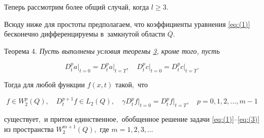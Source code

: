 \smallskip




Теперь рассмотрим более общий случай, когда $l\ge 3$. 

Всюду ниже для простоты предполагаем, что коэффициенты уравнения \eqref{eq:(1)} бесконечно дифференцируемы в~замкнутой области $\overline{Q}$.



\smallskip



\hypertarget{dzh:th4}{}



{\small\sc Теорема 4.} \it Пусть выполнены условия теоремы \rm \hyperlink{dzh:th3}{3}, \it кроме того\rm,  \it пусть 

$$

D_{t}^{p} a \bigr|_{t=0}=D_{t}^{p}  a \bigr| _{t=T}, \quad 

D_{t}^{p} c \bigr|_{t=0}=D_{t}^{p}  c \bigr|_{t=T}.

$$ 

Тогда для любой функции $f(x,t)$ такой$,$ что 

$$

f\in W_{2}^{p}(Q),\quad  

D_{t}^{p+1}f\in {{L}_{2}}(Q),\quad  

\gamma D_{t}^{p} f \bigr|_{t=0}=

D_{t}^{p} f \bigr|_{t=T},\quad p=0, 1, 2,\dots,m-1$$ 

существует$,$ и притом единственное$,$  обобщенное решение задачи \eqref{eq:(1)}--\eqref{eq:(3)}  из пространства $W_{2}^{m+1}(Q),$ где $m=1, 2, 3,\dots$ \rm





\smallskip



